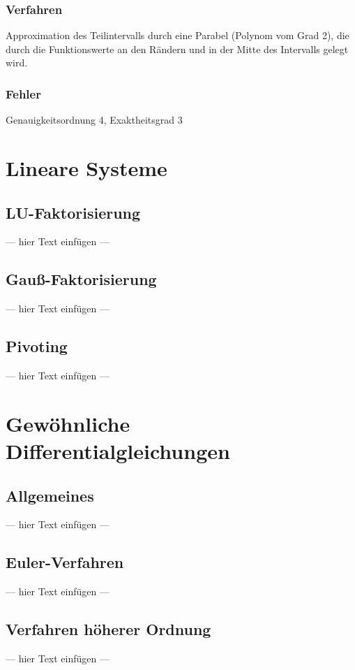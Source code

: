 \documentclass[a4paper, 12pt]{article}
\begin{document}
\subsubsection*{Verfahren}
Approximation des Teilintervalls durch eine Parabel (Polynom vom Grad 2), die durch die Funktionswerte an den Rändern und in der Mitte des Intervalls gelegt wird.

\subsubsection*{Fehler}
Genauigkeitsordnung 4, Exaktheitsgrad 3



\section{Lineare Systeme}


\subsection{LU-Faktorisierung}
--- hier Text einfügen ---


\subsection{Gauß-Faktorisierung}
--- hier Text einfügen ---


\subsection{Pivoting}
--- hier Text einfügen ---



\section{Gewöhnliche Differentialgleichungen}


\subsection{Allgemeines}
--- hier Text einfügen ---


\subsection{Euler-Verfahren}
--- hier Text einfügen ---


\subsection{Verfahren höherer Ordnung}
--- hier Text einfügen ---
\end{document}
